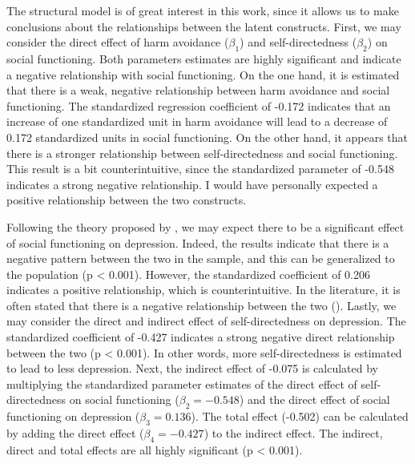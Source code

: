 \documentclass[11pt]{article}
\begin{document}
The structural model is of great interest in this work, since it allows us
to make conclusions about the relationships between the latent constructs.
First, we may consider the direct effect of harm avoidance ($\beta_1$) and
self-directedness ($\beta_2$) on social functioning. Both parameters estimates
are highly significant and indicate a negative relationship with social
functioning.
On the one hand, it is estimated that there is a weak, negative relationship
between harm avoidance and social functioning. The standardized regression
coefficient of -0.172 indicates that an increase of one standardized unit in
harm avoidance will lead to a decrease of 0.172 standardized units in social
functioning.
On the other hand, it appears that there is a stronger relationship between
self-directedness and social functioning. This result is a bit counterintuitive,
since the standardized parameter of -0.548 indicates a strong negative
relationship. I would have personally expected a positive relationship between
the two constructs.

Following the theory proposed by \textcite{tse2011}, we may expect there to be
a significant effect of social functioning on depression. Indeed, the results
indicate that there is a negative pattern between the two in the sample, and
this can be generalized to the population (p < 0.001). However, the standardized
coefficient of 0.206 indicates a positive relationship, which is counterintuitive.
In the literature, it is often stated that there is a negative relationship
between the two (\cite{tse2011}).
Lastly, we may consider the direct and indirect effect of self-directedness on
depression. The standardized coefficient of -0.427 indicates a strong negative
direct relationship between the two (p < 0.001). In other words, more
self-directedness is estimated to lead to less depression.
Next, the indirect effect of -0.075 is calculated by multiplying the
standardized parameter estimates of the direct effect of self-directedness on
social functioning ($\beta_2 = -0.548$) and the direct effect of social functioning
on depression ($\beta_3 = 0.136$). 
The total effect (-0.502) can be calculated by adding the direct effect
($\beta_4 = -0.427$) to the indirect effect. The indirect, direct and total
effects are all highly significant (p < 0.001).
\end{document}
